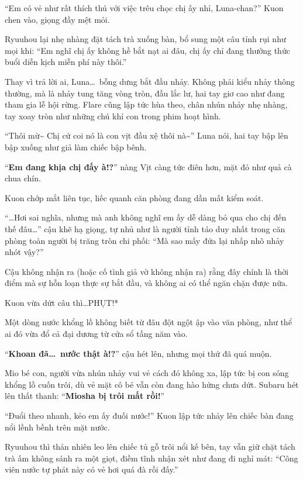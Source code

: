 \documentclass[../main.tex]{subfiles}
\begin{document}
``Em có vẻ như rất thích thú với việc trêu chọc chị ấy nhỉ, Luna-chan?'' Kuon chen vào, giọng đầy mệt mỏi.

Ryuuhou lại nhẹ nhàng đặt tách trà xuống bàn, bổ sung một câu tỉnh rụi như mọi khi: ``Em nghĩ chị ấy không hề bắt nạt ai đâu, chị ấy chỉ đang thưởng thức buổi diễn kịch miễn phí này thôi.''

Thay vì trả lời ai, Luna\dots\ bỗng dưng bắt đầu nhảy. Không phải kiểu nhảy thông thường, mà là nhảy tung tăng vòng tròn, đầu lắc lư, hai tay giơ cao như đang tham gia lễ hội rừng. Flare cũng lập tức hùa theo, chân nhún nhảy nhẹ nhàng, tay xoay tròn như những chú khỉ con trong phim hoạt hình.

``Thôi mừ\~{} Chị cứ coi nó là con vịt đầu xệ thôi nà\~{}'' Luna nói, hai tay bập lên bập xuống như giả làm chiếc bập bênh.

``\textbf{Em đang khịa chị đấy à!?}'' nàng Vịt càng tức điên hơn, mặt đỏ như quả cà chua chín.

Kuon chớp mắt liên tục, liếc quanh căn phòng đang dần mất kiểm soát.

``\dots Hơi sai nghĩa, nhưng mà anh không nghĩ em ấy dễ dàng bỏ qua cho chị đến thế đâu\dots'' cậu khẽ hạ giọng, tự nhủ như là người tỉnh táo duy nhất trong căn phòng toàn người bị trăng tròn chi phối: ``Mà sao mấy đứa lại nhấp nhô nhảy nhót vậy?''

Cậu không nhận ra (hoặc cố tình giả vờ không nhận ra) rằng đây chính là thời điểm mà sự hỗn loạn thực sự bắt đầu, và không ai có thể ngăn chặn được nữa.

Kuon vừa dứt câu thì\dots *PHỤT!*

Một dòng nước khổng lồ không biết từ đâu đột ngột ập vào văn phòng, như thể ai đó vừa đổ cả đại dương từ cửa sổ tầng năm vào.


``\textbf{Khoan đã\dots\ nước thật à!?}'' cậu hét lên, nhưng mọi thứ đã quá muộn.

Mio bé con, người vừa nhún nhảy vui vẻ cách đó không xa, lập tức bị con sóng khổng lồ cuốn trôi, dù vẻ mặt cô bé vẫn còn đang hào hứng chưa dứt. Subaru hét lên thất thanh: ``\textbf{Miosha bị trôi mất rồi!}''

``Đuổi theo nhanh, kẻo em ấy đuối nước!'' Kuon lập tức nhảy lên chiếc bàn đang nổi lềnh bềnh trên mặt nước.

Ryuuhou thì thản nhiên leo lên chiếc tủ gỗ trôi nổi kế bên, tay vẫn giữ chặt tách trà ấm không sánh ra một giọt, điềm tĩnh nhận xét như đang đi nghỉ mát: ``Công viên nước tự phát này có vẻ hơi quá đà rồi đấy.''
\end{document}
